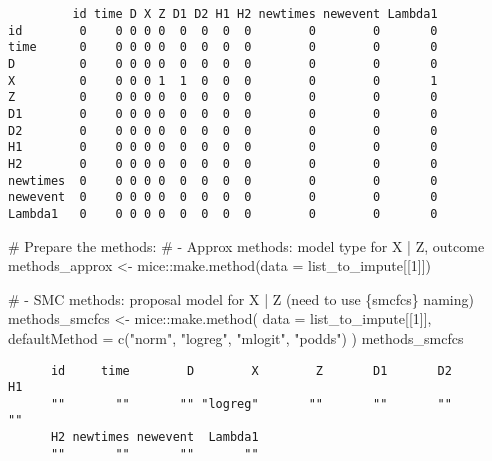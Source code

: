 \documentclass[
  12pt,
  a4paper,
]{article}
\newenvironment{Shaded}{\begin{snugshade}}{\end{snugshade}}
\newcommand{\AttributeTok}[1]{\textcolor[rgb]{0.40,0.45,0.13}{#1}}
\newcommand{\CommentTok}[1]{\textcolor[rgb]{0.37,0.37,0.37}{#1}}
\newcommand{\DecValTok}[1]{\textcolor[rgb]{0.68,0.00,0.00}{#1}}
\newcommand{\FunctionTok}[1]{\textcolor[rgb]{0.28,0.35,0.67}{#1}}
\newcommand{\NormalTok}[1]{\textcolor[rgb]{0.00,0.23,0.31}{#1}}
\newcommand{\OtherTok}[1]{\textcolor[rgb]{0.00,0.23,0.31}{#1}}
\newcommand{\SpecialCharTok}[1]{\textcolor[rgb]{0.37,0.37,0.37}{#1}}
\newcommand{\StringTok}[1]{\textcolor[rgb]{0.13,0.47,0.30}{#1}}
\begin{document}
\begin{verbatim}
         id time D X Z D1 D2 H1 H2 newtimes newevent Lambda1
id        0    0 0 0 0  0  0  0  0        0        0       0
time      0    0 0 0 0  0  0  0  0        0        0       0
D         0    0 0 0 0  0  0  0  0        0        0       0
X         0    0 0 0 1  1  0  0  0        0        0       1
Z         0    0 0 0 0  0  0  0  0        0        0       0
D1        0    0 0 0 0  0  0  0  0        0        0       0
D2        0    0 0 0 0  0  0  0  0        0        0       0
H1        0    0 0 0 0  0  0  0  0        0        0       0
H2        0    0 0 0 0  0  0  0  0        0        0       0
newtimes  0    0 0 0 0  0  0  0  0        0        0       0
newevent  0    0 0 0 0  0  0  0  0        0        0       0
Lambda1   0    0 0 0 0  0  0  0  0        0        0       0
\end{verbatim}

\begin{Shaded}
\begin{Highlighting}[]
\CommentTok{\# Prepare the methods:}
\CommentTok{\# {-} Approx methods: model type for X | Z, outcome}
\NormalTok{methods\_approx }\OtherTok{\textless{}{-}}\NormalTok{ mice}\SpecialCharTok{::}\FunctionTok{make.method}\NormalTok{(}\AttributeTok{data =}\NormalTok{ list\_to\_impute[[}\DecValTok{1}\NormalTok{]])}

\CommentTok{\# {-} SMC methods: proposal model for X | Z (need to use \{smcfcs\} naming)}
\NormalTok{methods\_smcfcs }\OtherTok{\textless{}{-}}\NormalTok{ mice}\SpecialCharTok{::}\FunctionTok{make.method}\NormalTok{(}
  \AttributeTok{data =}\NormalTok{ list\_to\_impute[[}\DecValTok{1}\NormalTok{]],}
  \AttributeTok{defaultMethod =} \FunctionTok{c}\NormalTok{(}\StringTok{"norm"}\NormalTok{, }\StringTok{"logreg"}\NormalTok{, }\StringTok{"mlogit"}\NormalTok{, }\StringTok{"podds"}\NormalTok{)}
\NormalTok{)}
\NormalTok{methods\_smcfcs}
\end{Highlighting}
\end{Shaded}

\begin{verbatim}
      id     time        D        X        Z       D1       D2       H1 
      ""       ""       "" "logreg"       ""       ""       ""       "" 
      H2 newtimes newevent  Lambda1 
      ""       ""       ""       "" 
\end{verbatim}
\end{document}
